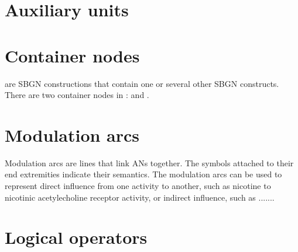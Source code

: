 




\section{Auxiliary units}\label{sec:af:AUs}




\section{Container nodes}
\label{sec:af:CNs}

 are SBGN constructions that contain one or several other SBGN constructs.  There are two container nodes in \SBGNAFLone:  and .




\section{Modulation arcs}\label{sec:af:arcs}

Modulation arcs are lines that link ANs together.  The symbols attached to their end extremities indicate their semantics.  The modulation arcs can be used to represent direct influence from one activity to another, such as nicotine to nicotinic acetylecholine receptor activity, or indirect influence, such as .......







\section{Logical operators}\label{sec:af:logic}




